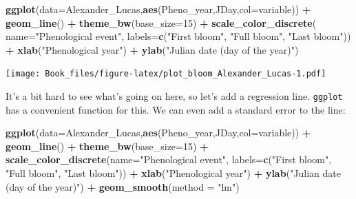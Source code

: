 \documentclass[
]{book}
\newenvironment{Shaded}{\begin{snugshade}}{\end{snugshade}}
\newcommand{\DataTypeTok}[1]{\textcolor[rgb]{0.13,0.29,0.53}{#1}}
\newcommand{\DecValTok}[1]{\textcolor[rgb]{0.00,0.00,0.81}{#1}}
\newcommand{\KeywordTok}[1]{\textcolor[rgb]{0.13,0.29,0.53}{\textbf{#1}}}
\newcommand{\NormalTok}[1]{#1}
\newcommand{\OperatorTok}[1]{\textcolor[rgb]{0.81,0.36,0.00}{\textbf{#1}}}
\newcommand{\StringTok}[1]{\textcolor[rgb]{0.31,0.60,0.02}{#1}}
\begin{document}
\begin{Shaded}
\begin{Highlighting}[]
\KeywordTok{ggplot}\NormalTok{(}\DataTypeTok{data=}\NormalTok{Alexander_Lucas,}\KeywordTok{aes}\NormalTok{(Pheno_year,JDay,}\DataTypeTok{col=}\NormalTok{variable)) }\OperatorTok{+}
\StringTok{  }\KeywordTok{geom_line}\NormalTok{() }\OperatorTok{+}
\StringTok{  }\KeywordTok{theme_bw}\NormalTok{(}\DataTypeTok{base_size=}\DecValTok{15}\NormalTok{) }\OperatorTok{+}
\StringTok{  }\KeywordTok{scale_color_discrete}\NormalTok{(}
    \DataTypeTok{name=}\StringTok{"Phenological event"}\NormalTok{,}
    \DataTypeTok{labels=}\KeywordTok{c}\NormalTok{(}\StringTok{"First bloom"}\NormalTok{, }\StringTok{"Full bloom"}\NormalTok{, }\StringTok{"Last bloom"}\NormalTok{)) }\OperatorTok{+}
\StringTok{  }\KeywordTok{xlab}\NormalTok{(}\StringTok{"Phenological year"}\NormalTok{) }\OperatorTok{+}
\StringTok{  }\KeywordTok{ylab}\NormalTok{(}\StringTok{"Julian date (day of the year)"}\NormalTok{)}
\end{Highlighting}
\end{Shaded}

\texttt{[image: Book\_files/figure-latex/plot\_bloom\_Alexander\_Lucas-1.pdf]}

It's a bit hard to see what's going on here, so let's add a regression line. \texttt{ggplot} has a convenient function for this. We can even add a standard error to the line:

\begin{Shaded}
\begin{Highlighting}[]
\KeywordTok{ggplot}\NormalTok{(}\DataTypeTok{data=}\NormalTok{Alexander_Lucas,}\KeywordTok{aes}\NormalTok{(Pheno_year,JDay,}\DataTypeTok{col=}\NormalTok{variable)) }\OperatorTok{+}
\StringTok{  }\KeywordTok{geom_line}\NormalTok{() }\OperatorTok{+}
\StringTok{  }\KeywordTok{theme_bw}\NormalTok{(}\DataTypeTok{base_size=}\DecValTok{15}\NormalTok{) }\OperatorTok{+}
\StringTok{  }\KeywordTok{scale_color_discrete}\NormalTok{(}\DataTypeTok{name=}\StringTok{"Phenological event"}\NormalTok{, }\DataTypeTok{labels=}\KeywordTok{c}\NormalTok{(}\StringTok{"First bloom"}\NormalTok{, }\StringTok{"Full bloom"}\NormalTok{, }\StringTok{"Last bloom"}\NormalTok{)) }\OperatorTok{+}
\StringTok{  }\KeywordTok{xlab}\NormalTok{(}\StringTok{"Phenological year"}\NormalTok{) }\OperatorTok{+}
\StringTok{  }\KeywordTok{ylab}\NormalTok{(}\StringTok{"Julian date (day of the year)"}\NormalTok{) }\OperatorTok{+}
\StringTok{  }\KeywordTok{geom_smooth}\NormalTok{(}\DataTypeTok{method =} \StringTok{"lm"}\NormalTok{)}
\end{Highlighting}
\end{Shaded}
\end{document}
